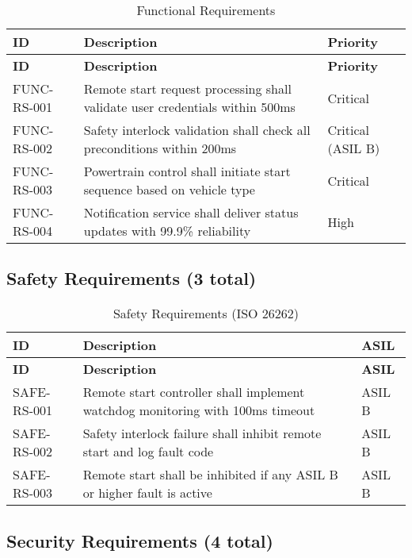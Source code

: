 \documentclass[11pt,a4paper]{article}
\begin{document}
\begin{longtable}{|p{2.5cm}|p{10cm}|p{2cm}|}
\caption{Functional Requirements}\label{tab:functional_req}\\
\hline
\textbf{ID} & \textbf{Description} & \textbf{Priority} \\
\hline
\endfirsthead
\hline
\textbf{ID} & \textbf{Description} & \textbf{Priority} \\
\hline
\endhead
\hline
\endfoot

FUNC-RS-001 & Remote start request processing shall validate user credentials within 500ms & Critical \\
\hline
FUNC-RS-002 & Safety interlock validation shall check all preconditions within 200ms & Critical (ASIL B) \\
\hline
FUNC-RS-003 & Powertrain control shall initiate start sequence based on vehicle type & Critical \\
\hline
FUNC-RS-004 & Notification service shall deliver status updates with 99.9\% reliability & High \\
\hline
\end{longtable}

\subsection{Safety Requirements (3 total)}

\begin{longtable}{|p{2.5cm}|p{10cm}|p{2cm}|}
\caption{Safety Requirements (ISO 26262)}\label{tab:safety_req}\\
\hline
\textbf{ID} & \textbf{Description} & \textbf{ASIL} \\
\hline
\endfirsthead
\hline
\textbf{ID} & \textbf{Description} & \textbf{ASIL} \\
\hline
\endhead
\hline
\endfoot

SAFE-RS-001 & Remote start controller shall implement watchdog monitoring with 100ms timeout & ASIL B \\
\hline
SAFE-RS-002 & Safety interlock failure shall inhibit remote start and log fault code & ASIL B \\
\hline
SAFE-RS-003 & Remote start shall be inhibited if any ASIL B or higher fault is active & ASIL B \\
\hline
\end{longtable}

\subsection{Security Requirements (4 total)}
\end{document}
